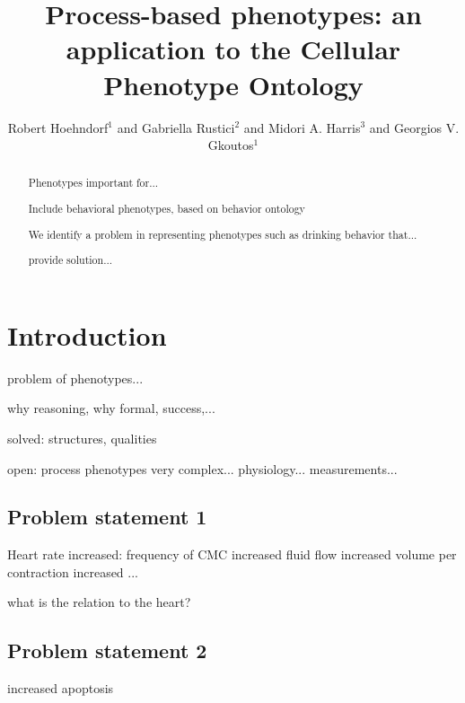 \documentclass{bioinfo}
\begin{document}

\title{Process-based phenotypes: an application to the Cellular
  Phenotype Ontology}

\author[Hoehndorf et al.]{Robert Hoehndorf$^1$ and Gabriella
  Rustici$^2$ and Midori A. Harris$^3$ and Georgios V. Gkoutos$^{1}$}

\address{$^{1}$Department of Genetics, University of Cambridge,
  Downing Street, Cambridge, Cambridge CB2 3EH, UK\\
  $^{2}$EBI, Wellcome Trust Genome Campus, Hinxton, Cambridge,
  Cambridge CB10 1SD, UK\\
  $^{3}$Department of Biochemistry; University of Cambridge, 80 Tennis
  Court Road, Cambridge CB2 1GA, UK}

\maketitle
 
\begin{abstract}
  Phenotypes important for...

  Include behavioral phenotypes, based on behavior ontology

  We identify a problem in representing phenotypes such as drinking
  behavior that...

  provide solution...
\end{abstract}

\section{Introduction}

problem of phenotypes...

why reasoning, why formal, success,...

solved: structures, qualities

open: process phenotypes very complex...  
physiology...
measurements...

\subsection{Problem statement 1}
Heart rate increased: frequency of CMC increased fluid flow increased
volume per contraction increased ...

what is the relation to the heart?


\subsection{Problem statement 2}
increased apoptosis
\end{document}
